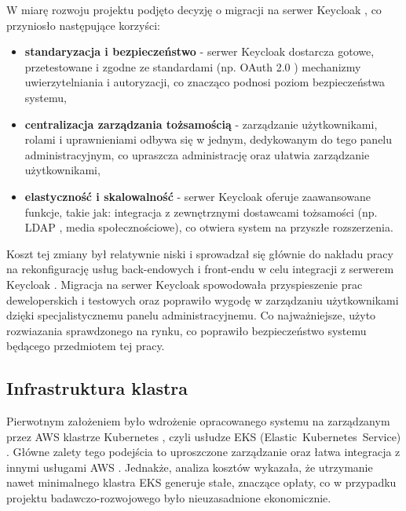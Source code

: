 W miarę rozwoju projektu podjęto decyzję o migracji na serwer Keycloak \cite{keycloak_docs}, co przyniosło następujące korzyści:
\begin{itemize}
    \item \textbf{standaryzacja i bezpieczeństwo} - serwer Keycloak \cite{keycloak_docs} dostarcza gotowe, przetestowane i zgodne ze standardami (np. OAuth 2.0 \cite{oauth2_rfc}) mechanizmy uwierzytelniania i autoryzacji, co znacząco podnosi poziom bezpieczeństwa systemu,
    \item \textbf{centralizacja zarządzania tożsamością} - zarządzanie użytkownikami, rolami i uprawnieniami odbywa się w jednym, dedykowanym do tego panelu administracyjnym, co upraszcza administrację oraz ułatwia zarządzanie użytkownikami,
    \item \textbf{elastyczność i skalowalność} - serwer Keycloak \cite{keycloak_docs} oferuje zaawansowane funkcje, takie jak: integracja z zewnętrznymi dostawcami tożsamości (np. LDAP \cite{ldap_rfc}, media społecznościowe), co otwiera system na przyszłe rozszerzenia.
\end{itemize}

\vspace{0.3em}

Koszt tej zmiany był relatywnie niski i sprowadzał się głównie do nakładu pracy na rekonfigurację usług back-endowych i front-endu w celu integracji z serwerem Keycloak \cite{keycloak_docs}. Migracja na serwer Keycloak \cite{keycloak_docs} spowodowała przyspieszenie prac deweloperskich i testowych oraz poprawiło wygodę w zarządzaniu użytkownikami dzięki specjalistycznemu panelu administracyjnemu. Co najważniejsze, użyto rozwiazania sprawdzonego na rynku, co poprawiło bezpieczeństwo systemu będącego przedmiotem tej pracy.

\subsection{Infrastruktura klastra}

Pierwotnym założeniem było wdrożenie opracowanego systemu na zarządzanym przez AWS \cite{aws_docs} klastrze Kubernetes \cite{kubernetes}, czyli usłudze EKS (\mbox{Elastic Kubernetes Service}) \cite{eks_docs}. Główne zalety tego podejścia to uproszczone zarządzanie oraz łatwa integracja z innymi usługami AWS \cite{aws_docs}. Jednakże, analiza kosztów wykazała, że utrzymanie nawet minimalnego klastra EKS \cite{eks_docs} generuje stałe, znaczące opłaty, co w przypadku projektu badawczo-rozwojowego było nieuzasadnione ekonomicznie.


